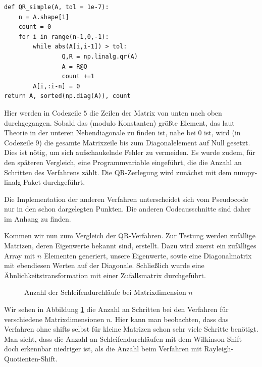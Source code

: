 \documentclass{article}
\theoremstyle{plain}
\begin{document}

\begin{lstlisting}
def QR_simple(A, tol = 1e-7):
	n = A.shape[1]
	count = 0
	for i in range(n-1,0,-1):
		while abs(A[i,i-1]) > tol:
				Q,R = np.linalg.qr(A)
				A = R@Q
				count +=1
		A[i,:i-n] = 0
return A, sorted(np.diag(A)), count
\end{lstlisting}


Hier werden in Codezeile $5$ die Zeilen der Matrix von unten nach oben durchgegangen. Sobald das (modulo Konstanten) größte Element, das laut Theorie in der unteren Nebendiagonale zu finden ist, nahe bei $0$ ist, wird (in Codezeile 9) die gesamte Matrixzeile bis zum Diagonalelement auf Null gesetzt. Dies ist nötig, um sich aufschaukelnde Fehler zu vermeiden.
Es wurde zudem, für den späteren Vergleich, eine Programmvariable eingeführt, die die Anzahl an Schritten des Verfahrens zählt. Die QR-Zerlegung wird zunächst mit dem numpy-linalg Paket durchgeführt.

Die Implementation der anderen Verfahren unterscheidet sich vom Pseudocode nur in den schon dargelegten Punkten. Die anderen Codeausschnitte sind daher im Anhang zu finden.

Kommen wir nun zum Vergleich der QR-Verfahren. Zur Testung werden zufällige Matrizen, deren Eigenwerte bekannt sind, erstellt. Dazu wird zuerst ein zufälliges Array mit $n$ Elementen generiert, unsere Eigenwerte, sowie eine Diagonalmatrix mit ebendiesen Werten auf der Diagonale. Schließlich wurde eine Ähnlichkeitstransformation mit einer Zufallsmatrix durchgeführt.

\begin{figure}[H]
  \centering
  \qquad
  \caption{Anzahl der Schleifendurchläufe bei Matrixdimension $n$}%
  \label{Schleifendurchläufe}
\end{figure}

Wir sehen in Abbildung \ref{Schleifendurchläufe} die Anzahl an Schritten bei den Verfahren für verschiedene Matrixdimensionen $n$. Hier kann man beobachten, dass das Verfahren ohne shifts selbst für kleine Matrizen schon sehr viele Schritte benötigt.  Man sieht, dass die Anzahl an Schleifendurchläufen mit dem Wilkinson-Shift doch erkennbar niedriger ist, als die Anzahl beim Verfahren mit Rayleigh-Quotienten-Shift.
\end{document}
